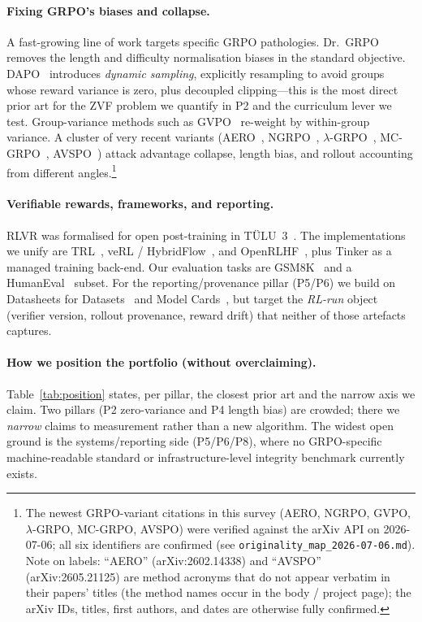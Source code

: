 \documentclass[11pt,a4paper]{article}
\begin{document}
\paragraph{Fixing GRPO's biases and collapse.}
A fast-growing line of work targets specific GRPO pathologies. Dr.\
GRPO~\cite{liu2025drgrpo} removes the length and difficulty normalisation biases
in the standard objective. DAPO~\cite{yu2025dapo} introduces \emph{dynamic
sampling}, explicitly resampling to avoid groups whose reward variance is zero,
plus decoupled clipping---this is the most direct prior art for the ZVF problem
we quantify in P2 and the curriculum lever we test. Group-variance methods such
as GVPO~\cite{gvpo2025} re-weight by within-group variance. A cluster of very
recent variants (AERO~\cite{aero2026}, NGRPO~\cite{ngrpo2025},
$\lambda$-GRPO~\cite{lambdagrpo2025}, MC-GRPO~\cite{mcgrpo2026},
AVSPO~\cite{avspo2026}) attack advantage
collapse, length bias, and rollout accounting from different angles.\footnote{The
newest GRPO-variant citations in this survey (AERO, NGRPO, GVPO, $\lambda$-GRPO,
MC-GRPO, AVSPO) were verified against the arXiv API on 2026-07-06; all six
identifiers are confirmed (see \texttt{originality\_map\_2026-07-06.md}). Note on
labels: ``AERO'' (arXiv:2602.14338) and ``AVSPO'' (arXiv:2605.21125) are method
acronyms that do not appear verbatim in their papers' titles (the method names
occur in the body / project page); the arXiv IDs, titles, first authors, and dates
are otherwise fully confirmed.}

\paragraph{Verifiable rewards, frameworks, and reporting.}
RLVR was formalised for open post-training in TÜLU~3~\cite{lambert2024tulu3}. The
implementations we unify are TRL~\cite{vonwerra2020trl}, veRL /
HybridFlow~\cite{sheng2024hybridflow}, and OpenRLHF~\cite{hu2024openrlhf}, plus
Tinker as a managed training back-end. Our evaluation tasks are
GSM8K~\cite{cobbe2021gsm8k} and a HumanEval~\cite{chen2021humaneval} subset. For
the reporting/provenance pillar (P5/P6) we build on Datasheets for
Datasets~\cite{gebru2021datasheets} and Model Cards~\cite{mitchell2019modelcards},
but target the \emph{RL-run} object (verifier version, rollout provenance, reward
drift) that neither of those artefacts captures.

\paragraph{How we position the portfolio (without overclaiming).}
Table~\ref{tab:position} states, per pillar, the closest prior art and the
narrow axis we claim. Two pillars (P2 zero-variance and P4 length bias) are
crowded; there we \emph{narrow} claims to measurement rather than a new
algorithm. The widest open ground is the systems/reporting side (P5/P6/P8),
where no GRPO-specific machine-readable standard or infrastructure-level
integrity benchmark currently exists.
\end{document}
